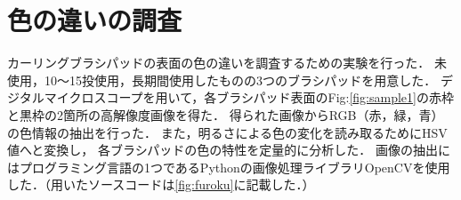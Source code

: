 \documentclass[main]{subfiles}
\begin{document}
\section{色の違いの調査}
カーリングブラシパッドの表面の色の違いを調査するための実験を行った．
未使用，10～15投使用，長期間使用したものの3つのブラシパッドを用意した．
デジタルマイクロスコープを用いて，各ブラシパッド表面のFig:\ref{fig:sample1}の赤枠と黒枠の2箇所の高解像度画像を得た．
得られた画像からRGB（赤，緑，青）の色情報の抽出を行った．
また，明るさによる色の変化を読み取るためにHSV値へと変換し，
各ブラシパッドの色の特性を定量的に分析した．
画像の抽出にはプログラミング言語の1つであるPythonの画像処理ライブラリOpenCVを使用した．（用いたソースコードは\ref{fig:furoku}に記載した．）
\end{document}
